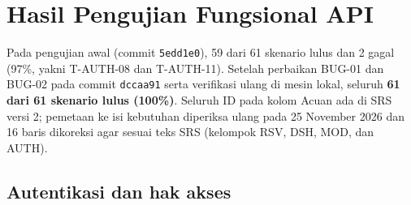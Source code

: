 \documentclass[11pt,a4paper]{article}
\begin{document}
\section{Hasil Pengujian Fungsional API}\label{sec:uat-api}
Pada pengujian awal (commit \texttt{5edd1e0}), 59 dari 61 skenario lulus dan 2 gagal (97\%, yakni T-AUTH-08 dan T-AUTH-11). Setelah perbaikan BUG-01 dan BUG-02 pada commit \texttt{dccaa91} serta verifikasi ulang di mesin lokal, seluruh \textbf{61 dari 61 skenario lulus (100\%)}. Seluruh ID pada kolom Acuan ada di SRS versi 2; pemetaan ke isi kebutuhan diperiksa ulang pada 25 November 2026 dan 16 baris dikoreksi agar sesuai teks SRS (kelompok RSV, DSH, MOD, dan AUTH).
\subsection{Autentikasi dan hak akses}
\end{document}
